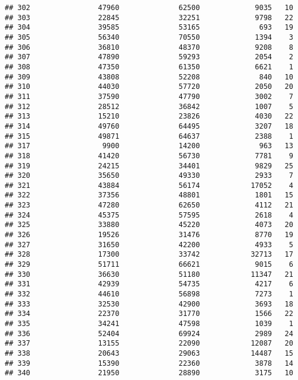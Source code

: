 \documentclass[
]{article}
\begin{document}
\begin{verbatim}
## 302                47960              62500             9035   10
## 303                22845              32251             9798   22
## 304                39585              53165              693   19
## 305                56340              70550             1394    3
## 306                36810              48370             9208    8
## 307                47890              59293             2054    2
## 308                47350              61350             6621    1
## 309                43808              52208              840   10
## 310                44030              57720             2050   20
## 311                37590              47790             3002    7
## 312                28512              36842             1007    5
## 313                15210              23826             4030   22
## 314                49760              64495             3207   18
## 315                49871              64637             2388    1
## 317                 9900              14200              963   13
## 318                41420              56730             7781    9
## 319                24215              34401             9829   25
## 320                35650              49330             2933    7
## 321                43884              56174            17052    4
## 322                37356              48801             1801   15
## 323                47280              62650             4112   21
## 324                45375              57595             2618    4
## 325                33880              45220             4073   20
## 326                19526              31476             8770   19
## 327                31650              42200             4933    5
## 328                17300              33742            32713   17
## 329                51711              66621             9015    6
## 330                36630              51180            11347   21
## 331                42939              54735             4217    6
## 332                44610              56898             7273    1
## 333                32530              42900             3693   18
## 334                22370              31770             1566   22
## 335                34241              47598             1039    1
## 336                52404              69924             2989   24
## 337                13155              22090            12087   20
## 338                20643              29063            14487   15
## 339                15390              22360             3878   14
## 340                21950              28890             3175   10

\end{verbatim}
\end{document}
